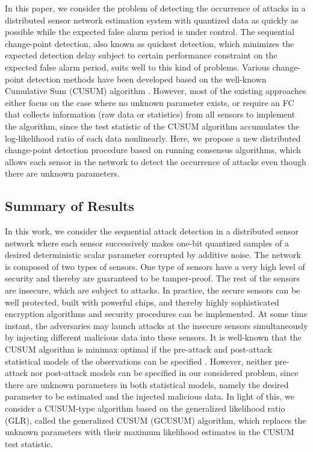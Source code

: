 \documentclass[11pt, draftclsnofoot, onecolumn]{IEEEtran}
\begin{document}
In this paper, we consider the problem of detecting the occurrence of attacks in a distributed sensor network estimation system with quantized data as quickly as possible while the expected false alarm period is under control. The sequential change-point detection, also known as quickest detection, which minimizes the expected detection delay subject to certain performance constraint on the expected false alarm period, suits well to this kind of problems. Various  change-point detection methods have been developed based on the well-known Cumulative Sum (CUSUM) algorithm \cite{basseville1993detection, tartakovsky2014sequential}.   However, most of the existing approaches either focus on the case where no unknown parameter exists, or require an FC that collects information (raw data or statistics) from all sensors to implement the algorithm, since the test statistic of the CUSUM algorithm accumulates the log-likelihood ratio of each data nonlinearly.  Here, we propose a new distributed change-point detection procedure based on running consensus algorithms, which allows each sensor in the network to  detect the occurrence of  attacks even though there are unknown parameters.  

\subsection{Summary of Results}

In this work, we consider the sequential attack detection in  a distributed sensor network where each sensor successively makes one-bit quantized samples of a desired deterministic scalar parameter corrupted by
additive noise. The network is composed of two types of sensors. One type of sensors have a very high level of security and thereby are guaranteed to be tamper-proof. The rest of the sensors are insecure, which are subject to attacks. In practice, the secure sensors can be well protected, built with powerful chips, and thereby highly sophisticated encryption algorithms and security procedures can be implemented.
At some time instant, the adversaries may launch attacks at the insecure sensors simultaneously by injecting different malicious data   into these    sensors.  It is well-known that the CUSUM algorithm is minimax optimal if the pre-attack and post-attack statistical models of the observations can be specified \cite{moustakides1986optimal}.  However, neither pre-attack nor post-attack  models  can be specified in our considered problem, since there are unknown parameters in both statistical models, namely the desired  parameter   to be estimated   and the injected malicious data. In light of this, we consider a CUSUM-type algorithm based on the generalized likelihood ratio (GLR), called the generalized CUSUM (GCUSUM) algorithm, which replaces the unknown parameters with their maximum likelihood estimates in the CUSUM test statistic.
\end{document}
